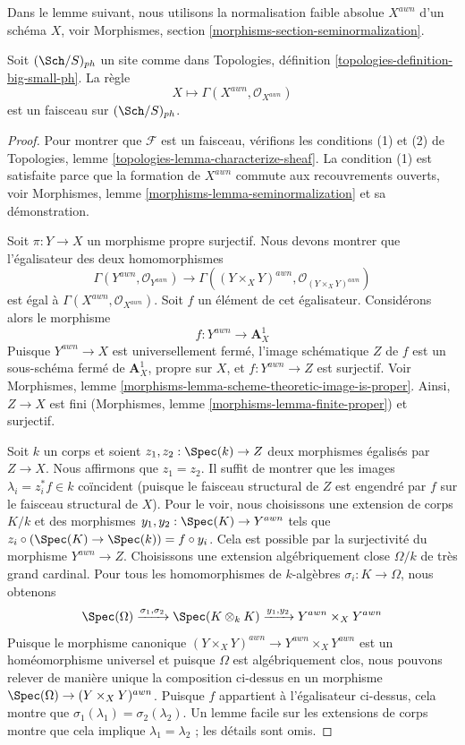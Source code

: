 \noindent
Dans le lemme suivant, nous utilisons la normalisation faible absolue $X^{awn}$
d'un schéma $X$, voir
Morphismes, section \ref{morphisms-section-seminormalization}.

\begin{lemma}
\label{lemma-weak-normalization-ph-sheaf}
Soit $(\Sch/S)_{ph}$ un site comme dans
Topologies, définition \ref{topologies-definition-big-small-ph}.
La règle
$$
X \longmapsto \Gamma(X^{awn}, \mathcal{O}_{X^{awn}})
$$
est un faisceau sur $(\Sch/S)_{ph}$.
\end{lemma}

\begin{proof}
Pour montrer que $\mathcal{F}$ est un faisceau, vérifions les conditions
(1) et (2) de Topologies, lemme \ref{topologies-lemma-characterize-sheaf}.
La condition (1) est satisfaite parce que la formation de $X^{awn}$ commute aux
recouvrements ouverts, voir Morphismes, lemme \ref{morphisms-lemma-seminormalization}
et sa démonstration.

\medskip\noindent
Soit $\pi : Y \to X$ un morphisme propre surjectif. Nous devons montrer
que l'égalisateur des deux homomorphismes
$$
\Gamma(Y^{awn}, \mathcal{O}_{Y^{awn}}) \to
\Gamma((Y \times_X Y)^{awn}, \mathcal{O}_{(Y \times_X Y)^{awn}})
$$
est égal à $\Gamma(X^{awn}, \mathcal{O}_{X^{awn}})$. Soit $f$ un
élément de cet égalisateur. Considérons alors le morphisme
$$
f : Y^{awn} \longrightarrow \mathbf{A}^1_X
$$
Puisque $Y^{awn} \to X$ est universellement fermé, l'image schématique
$Z$ de $f$ est un sous-schéma fermé de $\mathbf{A}^1_X$, propre sur $X$,
et $f : Y^{awn} \to Z$ est surjectif.
Voir Morphismes, lemme \ref{morphisms-lemma-scheme-theoretic-image-is-proper}.
Ainsi, $Z \to X$ est fini
(Morphismes, lemme \ref{morphisms-lemma-finite-proper})
et surjectif.

\medskip\noindent
Soit $k$ un corps et soient $z_1, z_2 : \Spec(k) \to Z$ deux
morphismes égalisés par $Z \to X$. Nous affirmons que $z_1 = z_2$.
Il suffit de montrer que les images $\lambda_i = z_i^*f \in k$ coïncident
(puisque le faisceau structural de $Z$ est engendré par $f$
sur le faisceau structural de $X$). Pour le voir, nous
choisissons une extension de corps
$K/k$ et des morphismes $y_1, y_2 : \Spec(K) \to Y^{awn}$ tels que
$z_i \circ (\Spec(K) \to \Spec(k)) = f \circ y_i$. Cela est possible
par la surjectivité du morphisme $Y^{awn} \to Z$. Choisissons une extension
algébriquement close $\Omega/k$ de très grand cardinal.
Pour tous les homomorphismes de $k$-algèbres $\sigma_i : K \to \Omega$,
nous obtenons
$$
\Spec(\Omega)
\xrightarrow{\sigma_1, \sigma_2}
\Spec(K \otimes_k K)
\xrightarrow{y_1, y_2}
Y^{awn} \times_X Y^{awn}
$$
Puisque le morphisme canonique
$(Y \times_X Y)^{awn} \to Y^{awn} \times_X Y^{awn}$
est un homéomorphisme universel et puisque $\Omega$ est algébriquement clos,
nous pouvons relever de manière unique la composition ci-dessus en un morphisme
$\Spec(\Omega) \to (Y \times_X Y)^{awn}$. Puisque $f$ appartient à l'égalisateur
ci-dessus, cela montre que $\sigma_1(\lambda_1) = \sigma_2(\lambda_2)$.
Un lemme facile sur les extensions de corps montre que cela implique
$\lambda_1 = \lambda_2$ ; les détails sont omis.


\end{proof}
